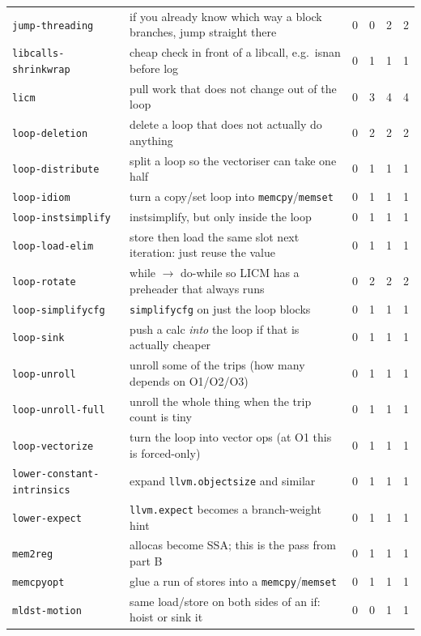 \documentclass[11pt,a4paper]{article}
\begin{document}
{\begin{longtable}{lp{5.6cm}rrrr}
\texttt{jump-threading} & if you already know which way a block branches, jump straight there & 0 & 0 & 2 & 2 \\
\texttt{libcalls-shrinkwrap} & cheap check in front of a libcall, e.g.\ isnan before log & 0 & 1 & 1 & 1 \\
\texttt{licm} & pull work that does not change out of the loop & 0 & 3 & 4 & 4 \\
\texttt{loop-deletion} & delete a loop that does not actually do anything & 0 & 2 & 2 & 2 \\
\texttt{loop-distribute} & split a loop so the vectoriser can take one half & 0 & 1 & 1 & 1 \\
\texttt{loop-idiom} & turn a copy/set loop into \texttt{memcpy}/\texttt{memset} & 0 & 1 & 1 & 1 \\
\texttt{loop-instsimplify} & instsimplify, but only inside the loop & 0 & 1 & 1 & 1 \\
\texttt{loop-load-elim} & store then load the same slot next iteration: just reuse the value & 0 & 1 & 1 & 1 \\
\texttt{loop-rotate} & while $\to$ do-while so LICM has a preheader that always runs & 0 & 2 & 2 & 2 \\
\texttt{loop-simplifycfg} & \texttt{simplifycfg} on just the loop blocks & 0 & 1 & 1 & 1 \\
\texttt{loop-sink} & push a calc \emph{into} the loop if that is actually cheaper & 0 & 1 & 1 & 1 \\
\texttt{loop-unroll} & unroll some of the trips (how many depends on O1/O2/O3) & 0 & 1 & 1 & 1 \\
\texttt{loop-unroll-full} & unroll the whole thing when the trip count is tiny & 0 & 1 & 1 & 1 \\
\texttt{loop-vectorize} & turn the loop into vector ops (at O1 this is forced-only) & 0 & 1 & 1 & 1 \\
\texttt{lower-constant-intrinsics} & expand \texttt{llvm.objectsize} and similar & 0 & 1 & 1 & 1 \\
\texttt{lower-expect} & \texttt{llvm.expect} becomes a branch-weight hint & 0 & 1 & 1 & 1 \\
\texttt{mem2reg} & allocas become SSA; this is the pass from part B & 0 & 1 & 1 & 1 \\
\texttt{memcpyopt} & glue a run of stores into a \texttt{memcpy}/\texttt{memset} & 0 & 1 & 1 & 1 \\
\texttt{mldst-motion} & same load/store on both sides of an if: hoist or sink it & 0 & 0 & 1 & 1 \\

\end{longtable}}
\end{document}
